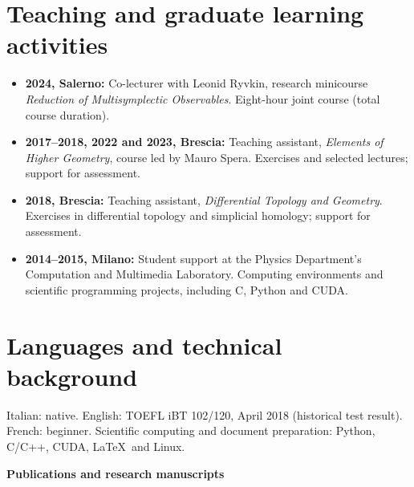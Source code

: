 \documentclass[11pt,a4paper]{article}
\begin{document}
\section*{Teaching and graduate learning activities}
\begin{itemize}
\item \textbf{2024, Salerno:} Co-lecturer with Leonid Ryvkin, research minicourse \emph{Reduction of Multisymplectic Observables}. Eight-hour joint course (total course duration).
\item \textbf{2017--2018, 2022 and 2023, Brescia:} Teaching assistant, \emph{Elements of Higher Geometry}, course led by Mauro Spera. Exercises and selected lectures; support for assessment.
\item \textbf{2018, Brescia:} Teaching assistant, \emph{Differential Topology and Geometry}. Exercises in differential topology and simplicial homology; support for assessment.
\item \textbf{2014--2015, Milano:} Student support at the Physics Department's Computation and Multimedia Laboratory. Computing environments and scientific programming projects, including C, Python and CUDA.
\end{itemize}
\section*{Languages and technical background}
Italian: native. English: TOEFL iBT 102/120, April 2018 (historical test result). French: beginner. Scientific computing and document preparation: Python, C/C++, CUDA, \LaTeX\ and Linux.
\clearpage
\begin{center}{\large\bfseries Publications and research manuscripts}\end{center}
\end{document}
